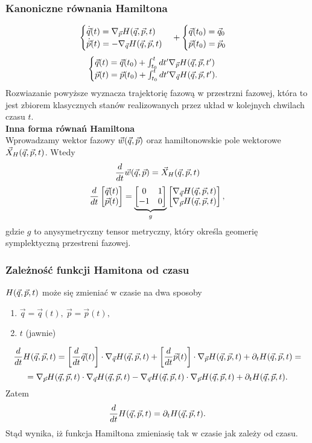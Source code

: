 \subsubsection{Kanoniczne równania Hamiltona}
\begin{equation}
\begin{cases}
	\dot{\vec{q}} (t) = \nabla_{\vec{p}} H(\vec{q},\vec{p},t) \\
	\dot{\vec{p}} (t) = - \nabla_{\vec{q}} H(\vec{q},\vec{p},t) 
\end{cases} +
\begin{cases}
	\vec{q}(t_0) = \vec{q}_0 \\
	\vec{p}(t_0) = \vec{p}_0
\end{cases}
\end{equation}
$$\begin{cases} 
	\vec{q}(t) = \vec{q}(t_0) + \int_{t_0}^t dt' \nabla_{\vec{p}} H(\vec{q},\vec{p},t') \\
	\vec{p}(t) = \vec{p}(t_0) + \int_{t_0}^t dt' \nabla_{\vec{q}} H(\vec{q},\vec{p},t').
\end{cases}$$
Rozwiazanie powyższe wyznacza trajektorię fazową w przestrzni fazowej, 
która to jest zbiorem klasycznych stanów realizowanych przez układ 
w kolejnych chwilach czasu $t$.\\
\textbf{Inna forma równań Hamiltona}\\
Wprowadzamy wektor fazowy $ \vec{w}(\vec{q},\vec{p}) $ oraz hamiltonowskie pole wektorowe
$\vec{X}_H (\vec{q},\vec{p},t)$. Wtedy
\begin{equation} \frac{d}{dt} \vec{w}(\vec{q},\vec{p}) = \vec{X}_H (\vec{q},\vec{p},t) \end{equation}
\begin{equation} \frac{d}{dt} 
\left[ \begin{matrix} \vec{q}(t) \\ \vec{p}(t)  \end{matrix} \right] 
= \underbrace{\left[ \begin{matrix} 0 & 1 \\ -1 & 0  \end{matrix} \right]}_{g}
\left[ \begin{matrix} \nabla_{\vec{q}}H(\vec{q},\vec{p},t) \\ \nabla_{\vec{p}}H(\vec{q},\vec{p},t) \end{matrix} \right]
,\end{equation}
gdzie $g$ to anysymetryczny tensor metryczny, który określa geomerię symplektyczną
przestreni fazowej.
\subsubsection{Zależność funkcji Hamitona od czasu}
$H(\vec{q},\vec{p},t)$ może się zmieniać w czasie na dwa sposoby
\begin{enumerate}
	\item $\vec{q} = \vec{q}(t),\ \vec{p} = \vec{p}(t),$
	\item $t$ (jawnie)
\end{enumerate}
$$\frac{d}{dt} H(\vec{q},\vec{p},t) =\left[ \frac{d}{dt} \vec{q}(t) \right]\cdot \nabla_{\vec{q}} H(\vec{q},\vec{p},t) +
\left[ \frac{d}{dt} \vec{p}(t)\right] \cdot \nabla_{\vec{p}} H(\vec{q},\vec{p},t) + \partial_t H(\vec{q},\vec{p},t) =
$$
$$=\nabla_{\vec{p}}H(\vec{q},\vec{p},t) \cdot \nabla_{\vec{q}}H(\vec{q},\vec{p},t) - \nabla_{\vec{q}}H(\vec{q},\vec{p},t) \cdot \nabla_{\vec{p}}H(\vec{q},\vec{p},t) + \partial_t
H(\vec{q},\vec{p},t).$$
Zatem
$$\frac{d}{dt} H(\vec{q},\vec{p},t) = \partial_t H(\vec{q},\vec{p},t).$$
Stąd wynika, iż funkcja Hamiltona zmieniasię tak w czasie jak zależy od czasu.

